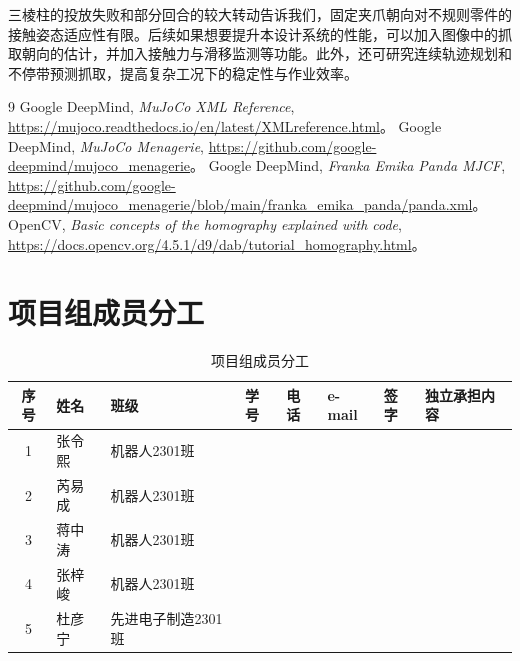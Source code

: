 \documentclass[UTF8,a4paper,11pt,fontset=windows]{ctexart}
\begin{document}
三棱柱的投放失败和部分回合的较大转动告诉我们，固定夹爪朝向对不规则零件的接触姿态适应性有限。后续如果想要提升本设计系统的性能，可以加入图像中的抓取朝向的估计，并加入接触力与滑移监测等功能。此外，还可研究连续轨迹规划和不停带预测抓取，提高复杂工况下的稳定性与作业效率。

\clearpage
\begin{thebibliography}{9}
 Google DeepMind, \emph{MuJoCo XML Reference}, \url{https://mujoco.readthedocs.io/en/latest/XMLreference.html}。
 Google DeepMind, \emph{MuJoCo Menagerie}, \url{https://github.com/google-deepmind/mujoco_menagerie}。
 Google DeepMind, \emph{Franka Emika Panda MJCF}, \url{https://github.com/google-deepmind/mujoco_menagerie/blob/main/franka_emika_panda/panda.xml}。
 OpenCV, \emph{Basic concepts of the homography explained with code}, \url{https://docs.opencv.org/4.5.1/d9/dab/tutorial_homography.html}。
\end{thebibliography}

\appendix
\section{项目组成员分工}


\begin{table}[H]\centering\small
\caption{项目组成员分工}\label{tab:member-info}
\begin{tabular}{clllllll}\toprule 序号 & 姓名 & 班级 & 学号 & 电话 & e-mail & 签字 & 独立承担内容\\\midrule
1 & 张令熙 & 机器人2301班 &  &  &  & &  \\
2 & 芮易成 & 机器人2301班 &  &  &  & &  \\
3 & 蒋中涛 & 机器人2301班 &  &  &  & &  \\
4 & 张梓峻 & 机器人2301班 &  &  &  & &  \\
5 & 杜彦宁 & 先进电子制造2301班 &  &  &  &  &  \\\bottomrule\end{tabular}
\end{table}
\end{document}
